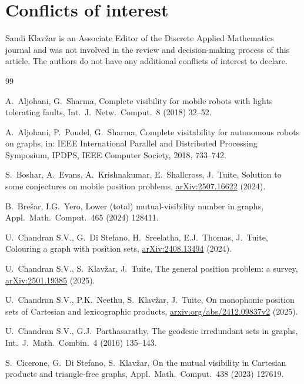 \documentclass[a4paper,12pt]{article}
\theoremstyle{definition}
\begin{document}
	\section*{Conflicts of interest}
	Sandi Klav\v{z}ar is an Associate Editor of the Discrete Applied Mathematics journal and was not involved in the review and decision-making process of this article. The authors do not have any additional conflicts of interest to declare. 
	
	\begin{thebibliography}{99}
		
		
		A.~Aljohani, G.~Sharma,
		Complete visibility for mobile robots with lights tolerating faults, 
		Int.\ J.\ Netw.\ Comput.\ 8 (2018) 32--52.
		
		A.~Aljohani, P.~Poudel, G.~Sharma, 
		Complete visitability for autonomous robots on graphs, 
		in: IEEE International Parallel and Distributed Processing Symposium, IPDPS, IEEE Computer Society, 2018, 733--742.
		
		S.~Boshar, A.~Evans, A.~Krishnakumar, E.~Shallcross, J.~Tuite, 
		Solution to some conjectures on mobile position problems, \url{arXiv:2507.16622} (2024).
		
		B.~Bre\v{s}ar, I.G.~Yero, 
		Lower (total) mutual-visibility number in graphs, 
		Appl.\ Math.\ Comput.\ 465 (2024) 128411.
		
		U.~Chandran S.V., G.~Di Stefano, H.~Sreelatha, E.J.~Thomas, J.~Tuite, 
		Colouring a graph with position sets, 
		\url{arXiv:2408.13494} (2024).
		
		U.~Chandran S.V., S.~Klav\v{z}ar, J.~Tuite, 
		The general position problem: a survey,
		\url{arXiv:2501.19385} (2025).
		
		 U.~Chandran S.V., P.K.~Neethu, S.~Klav\v{z}ar, J.~Tuite, 
		On monophonic position sets of Cartesian and lexicographic products,
		\url{arxiv.org/abs/2412.09837v2} (2025).
		
		U.~Chandran S.V., G.J.~Parthasarathy,
		The geodesic irredundant sets in graphs,
		Int.\ J.\ Math.\ Combin.\  4 (2016) 135--143.
		
		S.~Cicerone, G.~Di Stefano, S.~Klav\v{z}ar, 
		On the mutual visibility in Cartesian products and triangle-free graphs, 
		Appl.\ Math.\ Comput.\ 438 (2023) 127619.
		

\end{thebibliography}
\end{document}
